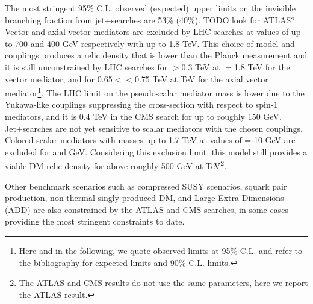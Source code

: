 The most stringent 95\% C.L. observed (expected) upper limits on the invisible branching
fraction from jet+\MET searches are 53\% (40\%).  TODO look for ATLAS?
Vector and axial vector mediators are excluded by LHC searches at values of \mdm up to 700 and 400 GeV respectively with \mmed up to 1.8 TeV. This choice of model and couplings produces a relic density that is lower than the Planck measurement and it is still unconstrained by LHC searches for \mdm$>$0.3 TeV at \mdm$=$1.8 TeV for the vector mediator, and for 0.65$<$\mdm$<$0.75 TeV at  TeV for the axial vector mediator\footnote{Here and in the following, we quote observed limits at 95\% C.L. and refer to the bibliography for expected limits and 90\% C.L. limits.}. 
The LHC limit on the pseudoscalar mediator mass is lower due to the Yukawa-like couplings suppressing the cross-section with respect to spin-1 mediators, and it is 0.4 TeV in the CMS search for \mdm up to roughly 150 GeV. 
Jet+\MET searches are not yet sensitive to scalar mediators with the chosen couplings. 
Colored scalar mediators with masses up to 1.7 TeV at values of \mdm = 10 GeV are excluded for  and  GeV. Considering this exclusion limit, this model still provides a viable DM relic density for \mmed \mdm above roughly 500 GeV at  TeV\footnote{The ATLAS and CMS results do not use the same parameters, here we report the ATLAS result.}.

Other benchmark scenarios such as compressed SUSY scenarios, 
squark pair production, 
non-thermal singly-produced DM, 
and Large Extra Dimensions (ADD) are also constrained by the ATLAS and CMS searches, in some cases providing the most stringent constraints to date. 


